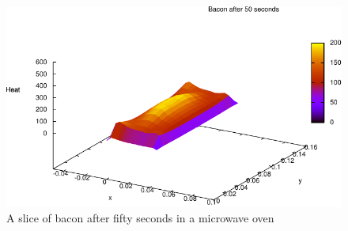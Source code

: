 \documentclass[final,hyperref={pdfpagelabels=false}]{beamer}
\begin{document}
\begin{frame}{}
\begin{columns}[t]
\begin{column}{.97\textwidth}
\begin{multicols}{2}
\begin{figure}[!h]
  \begin{center}
    \includegraphics[width=\linewidth]{bacon-50sec.pdf}
  \end{center}
  \caption{A slice of bacon after fifty seconds in a microwave oven}
  \label{fig:bacon-50sec}
\end{figure}


    \end{multicols}



  \end{column}
  \end{columns}
  \end{frame}
\end{document}
